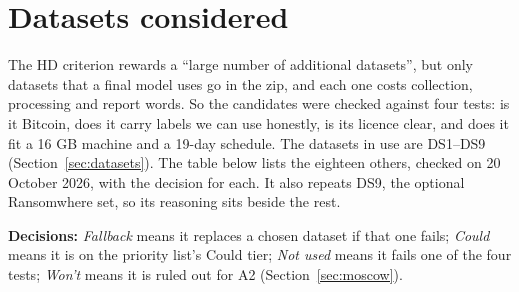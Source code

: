 \section{Datasets considered}
\label{app:datasets}

The HD criterion rewards a ``large number of additional datasets'', but only datasets that a
final model uses go in the zip, and each one costs collection, processing and report words. So
the candidates were checked against four tests: is it Bitcoin, does it carry labels we can use
honestly, is its licence clear, and does it fit a 16 GB machine and a 19-day schedule. The
datasets in use are DS1--DS9 (Section~\ref{sec:datasets}). The table below lists the eighteen
others, checked on 20 October 2026, with the decision for each. It also repeats DS9, the
optional Ransomwhere set, so its reasoning sits beside the rest.

\textbf{Decisions:} \emph{Fallback} means it replaces a chosen dataset if that one fails;
\emph{Could} means it is on the priority list's Could tier; \emph{Not used} means it fails one of
the four tests; \emph{Won't} means it is ruled out for A2 (Section~\ref{sec:moscow}).

